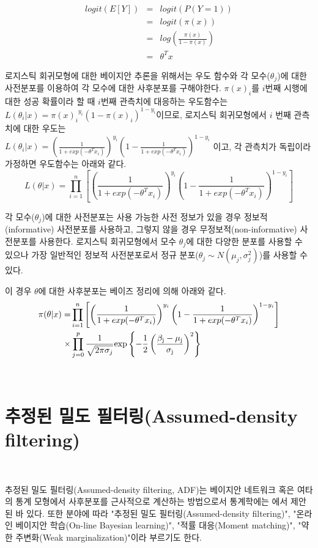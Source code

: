 \documentclass[oneside,b5paper,11pt]{book}
\theoremstyle{plain}
\theoremstyle{definition}
\theoremstyle{remark}
\theoremstyle{definition}
\numberwithin{equation}{chapter}
\begin{document}
\begin{eqnarray}
    {}logit(E[Y])
  &=& logit(P(Y=1))  \\
  &=& logit(\pi(x))  \\
  &=& log \left( \frac{\pi(x)}{1-\pi(x)}\right) \\
  &=& \theta^T x
\end{eqnarray}


로지스틱 회귀모형에 대한 베이지안 추론을 위해서는 우도 함수와 각 모수($\theta_{j}$)에 대한 사전분포를 이용하여 각 모수에 대한 사후분포를 구해야한다. $\pi(x)_i$를 $i$번째 시행에 대한 성공 확률이라 할 때 $i$번째 관측치에 대응하는 우도함수는 $L(\theta_i |x) = {\pi(x)_i}^{y_i} (1-\pi(x)_i)^{1-y_i}$이므로, 로지스틱 회귀모형에서 $i$ 번째 관측치에 대한 우도는\\ $L(\theta_i |x) = {\left(\frac{1}{1+exp(-\theta^T x_i)}\right)}^{y_i} \left(1-{\frac{1}{1+exp(-\theta^T x_i)}}\right)^{1-y_i}$ 이고, 각 관측치가 독립이라 가정하면 우도함수는 아래와 같다.
$$L(\theta|x)= \prod\limits_{i=1}^{n}\left[{\left(\frac{1}{1+exp(-\theta^T x_i)}\right)}^{y_i} \left(1-{\frac{1}{1+exp(-\theta^T x_i)}}\right)^{1-y_i}\right]$$

 각 모수($\theta_j$)에 대한 사전분포는 사용 가능한 사전 정보가 있을 경우 정보적(informative) 사전분포를 사용하고, 그렇지 않을 경우 무정보적(non-informative) 사전분포를 사용한다. 로지스틱 회귀모형에서 모수 $\theta_j$에 대한 다양한 분포를 사용할 수 있으나 가장 일반적인 정보적 사전분포로서 정규 분포($\theta_j \sim N(\mu_{j} , \sigma_{j}^2)$)를 사용할 수 있다.

 이 경우 $\theta$에 대한 사후분포는 베이즈 정리에 의해 아래와 같다.
\begin{equation}
\begin{split}
\pi(\theta|x) =
&\prod\limits_{i=1}^{n}
	\left[
		\left(
			\frac{1}{1+exp(-\theta^T x_i)}
		\right) ^{y_i}
		\left(
			1-{\frac{1}{1+exp(-\theta^T x_i)}}
		\right)^{1-y_i}
	\right] \\
\times &\prod\limits_{j=0}^{p} \frac{1}{\sqrt{2\pi\sigma_j}}
	\rm{exp}
	\left\{
		-\frac{1}{2}
		\left(
			\frac{\beta_j - \mu_j}{\sigma_j}
		\right)^2
	\right\}
\end{split}
\end{equation}


{}\
\section{추정된 밀도 필터링(Assumed-density filtering)}
{}\

 추정된 밀도 필터링(Assumed-density filtering, ADF)는 베이지안 네트워크 혹은 여타의 통계 모형에서 사후분포를 근사적으로 계산하는 방법으로서 통계학에는 \citet{Lauritzen1992}에서 제안된 바 있다. 또한 분야에 따라 "추정된 밀도 필터링(Assumed-density filtering)", "온라인 베이지안 학습(On-line Bayesian learning)", "적률 대응(Moment matching)", "약한 주변화(Weak marginalization)"이라 부르기도 한다. \citep{Minka2013}
\end{document}
